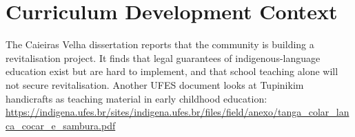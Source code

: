 \documentclass[12pt]{article}
\begin{document}
\section{Curriculum Development Context}
The Caieiras Velha dissertation reports that the community is building a revitalisation project. It finds that legal guarantees of indigenous-language education exist but are hard to implement, and that school teaching alone will not secure revitalisation. Another UFES document looks at Tupinikim handicrafts as teaching material in early childhood education: \url{https://indigena.ufes.br/sites/indigena.ufes.br/files/field/anexo/tanga_colar_lanca_cocar_e_sambura.pdf}
\end{document}
